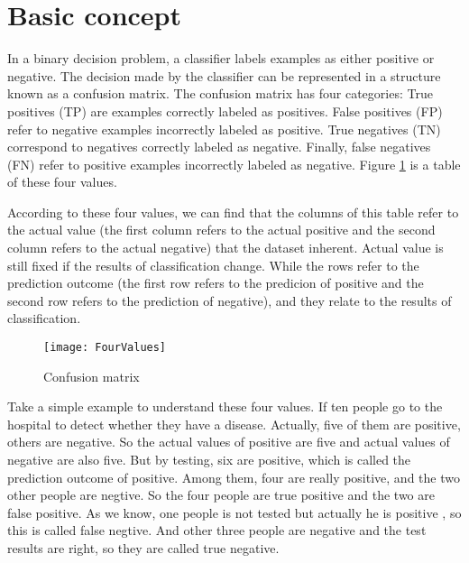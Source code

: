 \documentclass[a4paper,12pt]{article}
\begin{document}
\section{Basic concept}

  In a binary decision problem, a classifier labels examples as either positive or negative. The decision made by the classifier can be represented in a structure known as a confusion matrix. The confusion matrix has four categories: True positives (TP) are examples correctly labeled as positives. False positives (FP) refer to negative examples incorrectly labeled as positive. True negatives (TN) correspond to negatives correctly labeled as negative. Finally, false negatives (FN) refer to positive examples incorrectly labeled as negative. Figure \ref{ConfusionMatrix:1} is a table of these four values. 

According to these four values, we can find that the columns of this table refer to the actual value (the first column refers to the actual positive and the second column refers to the actual negative) that the dataset inherent. Actual value is still fixed if the results of classification change. While the rows refer to the prediction outcome (the first row refers to the predicion of positive and the second row refers to the prediction of negative), and they relate to the results of classification.
\begin{figure}[!ht]
\centering\texttt{[image: FourValues]}
\caption{Confusion matrix}\label{ConfusionMatrix:1}
\end{figure} 


Take a simple example to understand these four values. 
If ten people go to the hospital to detect whether they have a disease. Actually, five of them are positive, others are negative. So the actual values of positive are five and actual values of negative are also five. But by testing, six are positive, which is called the prediction outcome of positive. Among them, four are really positive, and the two other people are negtive. So the four people are true positive and the two are false positive. As we know, one people is not tested but actually he is positive , so this is called false negtive. And other three people are negative and the test results are right, so they are called true negative. 
\end{document}
